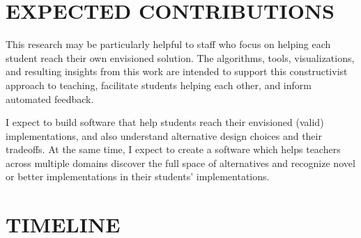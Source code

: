 \documentclass[12pt]{article}
\begin{document}
\section{EXPECTED CONTRIBUTIONS}

This research may be particularly helpful to staff who focus on helping each student reach their own envisioned solution. The algorithms, tools, visualizations, and resulting insights from this work are intended to support this constructivist approach to teaching, facilitate students helping each other, and inform automated feedback.

I expect to build software that help students reach their envisioned (valid) implementations, and also understand alternative design choices and their tradeoffs. At the same time, I expect to create a software which helps teachers across multiple domains discover the full space of alternatives and recognize novel or better implementations in their students' implementations.


\section{TIMELINE}
\end{document}
